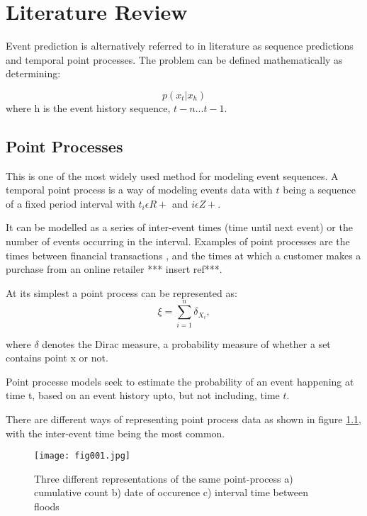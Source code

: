 
\chapter{Literature Review} %


\label{Chapter2} %

Event prediction is alternatively referred to in literature as sequence predictions and temporal point processes. The problem can be defined mathematically as determining:

$$p(x_t | x_h)  $$
where h is the event history sequence, ${t-n ... t-1}$.

\section{Point Processes}

This is one of the most widely used method for modeling event sequences. A temporal point process \parencite{DaleyJones} is a way of modeling events data with $t$ being a sequence of a fixed period interval with $t_i \epsilon R+$ and $i \epsilon Z+$. 

It can be modelled as a series of inter-event times (time until next event) or the number of events occurring in the interval. Examples of point processes are the times between financial transactions \parencite{EngleRusell}, and the times at which a customer makes a purchase from an online retailer *** insert ref***.

At its simplest a point process can be represented as:
$${\xi =\sum _{i=1}^{n}\delta _{X_{i}},}$$

where $\delta$ denotes the Dirac measure, a probability measure of whether a set contains point x or not.

Point processe models seek to estimate the probability of an event happening at time t, based on an event history upto, but not including, time $t$. 

There are different ways of representing point process data as shown in figure \ref{fig:fig1}, with the inter-event time being the most common. 

\begin{figure}[h!]
	\texttt{[image: fig001.jpg]}
	\caption{Three different representations of the same point-process a) cumulative count b) date of occurence c) interval time between floods}
	\label{fig:fig1}
\end{figure}

